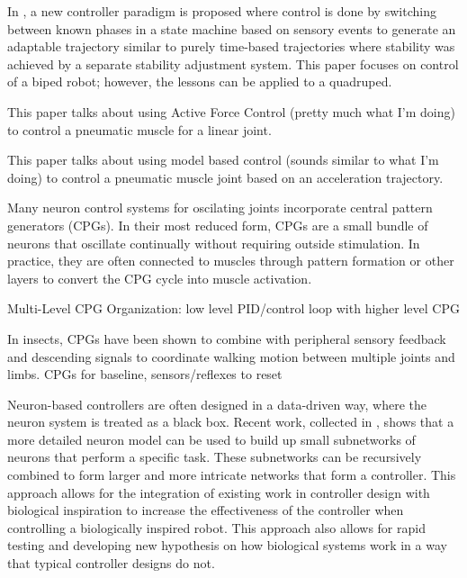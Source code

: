 


In \cite{EventBasedWalking}, a new controller paradigm is proposed where control
is done by switching between known phases in a state machine based on sensory
events to generate an adaptable trajectory similar to purely time-based
trajectories where stability was achieved by a separate stability adjustment
system. This paper focuses on control of a biped robot; however, the lessons can
be applied to a quadruped.


This paper talks about using Active Force Control (pretty much what I'm doing)
to control a pneumatic muscle for a linear joint.
\cite{Jahanabadi2009}

This paper talks about using model based control (sounds similar to what I'm 
doing) to control a pneumatic muscle joint based on an acceleration trajectory.
\cite{Wang2013}




Many neuron control systems for oscilating joints incorporate central pattern
generators (CPGs). In their most reduced form, CPGs are a small bundle of
neurons that oscillate continually without requiring outside stimulation. In
practice, they are often connected to muscles through pattern formation or other
layers to convert the CPG cycle into muscle activation.
\cite{CPGReview}

Multi-Level CPG Organization: low level PID/control loop with higher level CPG
\cite{MultiLevelCPG}

In insects, CPGs have been shown to combine with peripheral sensory feedback and
descending signals to coordinate walking motion between multiple joints and
limbs.
CPGs for baseline, sensors/reflexes to reset \cite{SixLeggedWalking}


Neuron-based controllers are often designed in a data-driven way, where the
neuron system is treated as a black box. Recent work, collected in 
\cite{NickFunctionalSubnetwork}, shows that a more detailed neuron model can be
used to build up small subnetworks of neurons that perform a specific task.
These subnetworks can be recursively combined to form larger and more intricate
networks that form a controller. This approach allows for the integration of
existing work in controller design with biological inspiration to increase the
effectiveness of the controller when controlling a biologically inspired robot.
This approach also allows for rapid testing and developing new hypothesis on how
biological systems work in a way that typical controller designs do not.